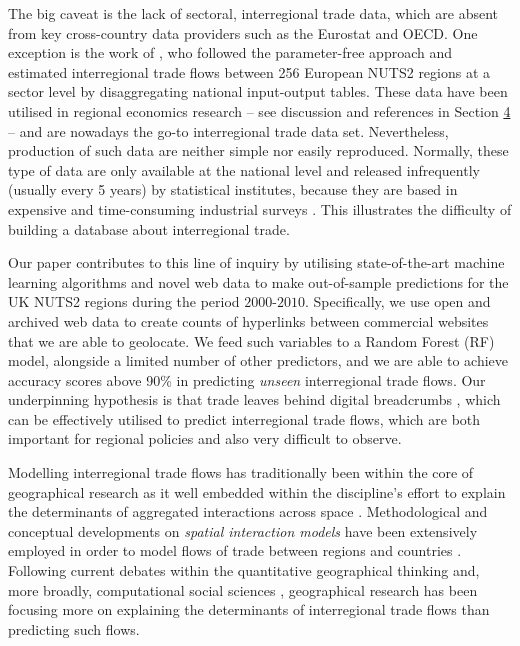 \documentclass[]{interact}
\theoremstyle{plain}%
\theoremstyle{definition}
\theoremstyle{remark}
\begin{document}
The big caveat is the lack of sectoral, interregional trade data, which
are absent from key cross-country data providers such as the Eurostat
and OECD. One exception is the work of \citet{thissen2013integrated},
who followed the parameter-free \citet{simini2012universal} approach and
estimated interregional trade flows between 256 European NUTS2 regions
at a sector level by disaggregating national input-output tables. These
data have been utilised in regional economics research -- see discussion
and references in Section \protect\hyperlink{sec:4}{4} -- and are
nowadays the go-to interregional trade data set. Nevertheless,
production of such data are neither simple nor easily reproduced.
Normally, these type of data are only available at the national level
and released infrequently (usually every 5 years) by statistical
institutes, because they are based in expensive and time-consuming
industrial surveys \citep{boero2018regional}. This illustrates the
difficulty of building a database about interregional trade.

Our paper contributes to this line of inquiry by utilising
state-of-the-art machine learning algorithms and novel web data to make
out-of-sample predictions for the UK NUTS2 regions during the period
\(2000\)-\(2010\). Specifically, we use open and archived web data to
create counts of hyperlinks between commercial websites that we are able
to geolocate. We feed such variables to a Random Forest (RF) model,
alongside a limited number of other predictors, and we are able to
achieve accuracy scores above 90\% in predicting \emph{unseen}
interregional trade flows. Our underpinning hypothesis is that trade
leaves behind digital breadcrumbs \citep{rabari_storper2014}, which can
be effectively utilised to predict interregional trade flows, which are
both important for regional policies and also very difficult to observe.

Modelling interregional trade flows has traditionally been within the
core of geographical research as it well embedded within the
discipline's effort to explain the determinants of aggregated
interactions across space \citep[for a recent review
see][]{oshan2020spatial}. Methodological and conceptual developments on
\emph{spatial interaction models} have been extensively employed in
order to model flows of trade between regions
\citep{chun2012modeling, paul2008incorporating} and countries
\citep{de2017testing, de2017competing}. Following current debates within
the quantitative geographical thinking \citep{singleton2021geographic}
and, more broadly, computational social sciences
\citep{lazer2009social}, geographical research has been focusing more on
explaining the determinants of interregional trade flows than predicting
such flows.
\end{document}
